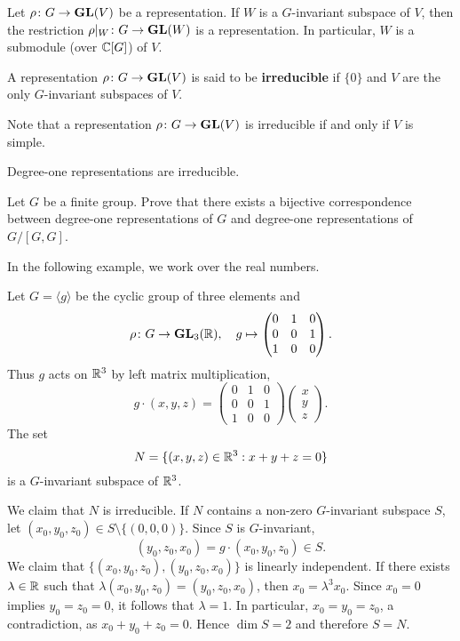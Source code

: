 Let $\rho\colon G\to\mathbf{GL}(V)$ be a representation. 
If $W$ is a $G$-invariant subspace of $V$, 
then the restriction $\rho|_W\colon G\to\mathbf{GL}(W)$
is a representation. In particular, $W$ is a submodule (over $\mathbb{C}[G]$) 
of $V$. 

\begin{definition}
    A representation $\rho\colon G\to\mathbf{GL}(V)$ is 
    said to be \textbf{irreducible} if 
    $\{0\}$ and $V$ are the only 
    $G$-invariant subspaces of $V$. 
\end{definition}

Note that a representation $\rho\colon G\to\mathbf{GL}(V)$ is irreducible
if and only if $V$ is simple. 

\begin{example}
    Degree-one representations are irreducible. 
\end{example}

\begin{exercise}
\label{xca:degree-one}
    Let $G$ be a finite group. 
    Prove that there exists a bijective correspondence between 
    degree-one representations of $G$ and 
    degree-one representations of $G/[G,G]$. 
\end{exercise}

In the following example, we work over the real numbers. 

\begin{example}
Let $G=\langle g\rangle$ be the cyclic group of three elements and 
\[
\rho\colon G\to\mathbf{GL}_3(\mathbb{R}),\quad
g\mapsto\begin{pmatrix}
  0&1&0\\
  0&0&1\\
  1&0&0
\end{pmatrix}.
\]
Thus $g$ acts on $\mathbb{R}^{3}$ by left matrix multiplication,
\[
g\cdot (x,y,z)=
\begin{pmatrix}
  0&1&0\\
  0&0&1\\
  1&0&0
\end{pmatrix}\begin{pmatrix}
x\\
y\\
z
\end{pmatrix}.
\]
The set 
\[
N=\{(x,y,z)\in\mathbb{R}^{3}:x+y+z=0\}
\]
is a $G$-invariant subspace of $\mathbb{R}^3$. 

We claim that $N$ is irreducible. 
If $N$ contains a non-zero $G$-invariant subspace $S$, 
let $(x_0,y_0,z_0)\in S\setminus\{(0,0,0)\}$. Since $S$ is $G$-invariant, 
\[
(y_0,z_0,x_0)=g\cdot (x_0,y_0,z_0)\in S. 
\]
We claim that $\{(x_0,y_0,z_0),(y_0,z_0,x_0)\}$ is linearly independent. If there exists $\lambda\in\mathbb{R}$ 
such that $\lambda(x_0,y_0,z_0)=(y_0,z_0,x_0)$, then $x_0=\lambda^3 x_0$. Since $x_0=0$ implies 
$y_0=z_0=0$, it follows that $\lambda=1$. In particular, $x_0=y_0=z_0$, a contradiction, as $x_0+y_0+z_0=0$. 
Hence $\dim S=2$ and therefore $S=N$. 
\end{example}

